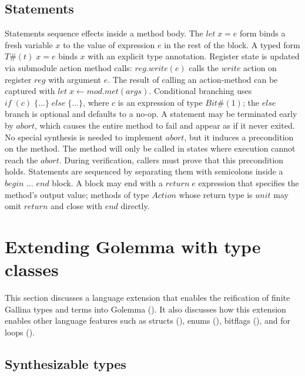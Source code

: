 \documentclass[fontset=fira-newtxsf]{mitthesis}
\theoremstyle{definition}
\theoremstyle{plain}
\begin{document}
\subsection{Statements}
Statements sequence effects inside a method body.
The $\mathit{let}\;\mathit{x} = \mathit{e}$ form binds a fresh variable $\mathit{x}$ to the value of expression $\mathit{e}$ in the rest of the block.
A typed form $\mathit{T}\#(t)\;\mathit{x} = \mathit{e}$ binds $\mathit{x}$ with an explicit type annotation.
Register state is updated via submodule action method calls: $\mathit{reg}.\mathit{write}(e)$ calls the $\mathit{write}$ action on register $\mathit{reg}$ with argument $\mathit{e}$.
The result of calling an action-method can be captured with $\mathit{let}\;\mathit{x} \leftarrow \mathit{mod}.\mathit{met}(\mathit{args})$.
Conditional branching uses $\mathit{if}\;(\mathit{c})\;\{\ldots\}\;\mathit{else}\;\{\ldots\}$, where $\mathit{c}$ is an expression of type $\mathit{Bit}\#(1)$; the $\mathit{else}$ branch is optional and defaults to a no-op.
A statement may be terminated early by $\mathit{abort}$, which causes the entire method to fail and appear as if it never exited.
No special synthesis is needed to implement $\mathit{abort}$, but it induces a precondition on the method.
The method will only be called in states where execution cannot reach the $\mathit{abort}$.
During verification, callers must prove that this precondition holds.
Statements are sequenced by separating them with semicolons inside a $\mathit{begin}$ ... $\mathit{end}$ block.
A block may end with a $\mathit{return}\;\mathit{e}$ expression that specifies the method's output value; methods of type $\mathit{Action}$ whose return type is $\mathit{unit}$ may omit $\mathit{return}$ and close with $\mathit{end}$ directly.

\section{Extending Golemma with type classes} \label{sec:Golemma-synth}

This section discusses a language extension that enables the reification of finite Gallina types and terms into Golemma ().
It also discusses how this extension enables other language features such as structs (), enums (), bitflags (), and for loops ().

\subsection{Synthesizable types} \label{sec:Golemma-synthesizable}
\end{document}
